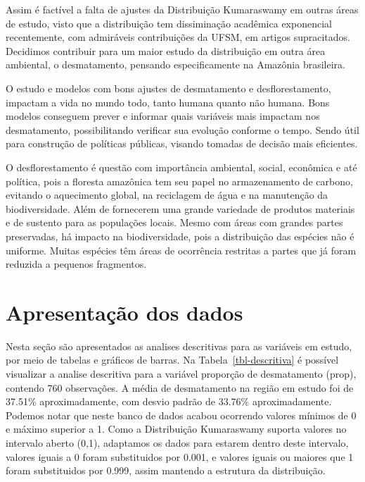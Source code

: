 \documentclass[
]{article}
\begin{document}
Assim é factível a falta de ajustes da Distribuição Kumaraswamy em
outras áreas de estudo, visto que a distribuição tem dissiminação
acadêmica exponencial recentemente, com admiráveis contribuições da
UFSM, em artigos supracitados. Decidimos contribuir para um maior estudo
da distribuição em outra área ambiental, o desmatamento, pensando
especificamente na Amazônia brasileira.

O estudo e modelos com bons ajustes de desmatamento e desflorestamento,
impactam a vida no mundo todo, tanto humana quanto não humana. Bons
modelos conseguem prever e informar quais variáveis mais impactam nos
desmatamento, possibilitando verificar sua evolução conforme o tempo.
Sendo útil para construção de políticas públicas, visando tomadas de
decisão mais eficientes.

O desflorestamento é questão com importância ambiental, social,
econômica e até política, pois a floresta amazônica tem seu papel no
armazenamento de carbono, evitando o aquecimento global, na reciclagem
de água e na manutenção da biodiversidade. Além de fornecerem uma grande
variedade de produtos materiais e de sustento para as populações locais.
Mesmo com áreas com grandes partes preservadas, há impacto na
biodiversidade, pois a distribuição das espécies não é uniforme. Muitas
espécies têm áreas de ocorrência restritas a partes que já foram
reduzida a pequenos fragmentos.

\section{\centering Apresentação dos dados}

Nesta seção são apresentados as analises descritivas para as variáveis
em estudo, por meio de tabelas e gráficos de barras. Na
Tabela~\ref{tbl-descritiva} é possível visualizar a analise descritiva
para a variável proporção de desmatamento (prop), contendo 760
observações. A média de desmatamento na região em estudo foi de 37.51\%
aproximadamente, com desvio padrão de 33.76\% aproximadamente. Podemos
notar que neste banco de dados acabou ocorrendo valores mínimos de 0 e
máximo superior a 1. Como a Distribuição Kumaraswamy suporta valores no
intervalo aberto (0,1), adaptamos os dados para estarem dentro deste
intervalo, valores iguais a 0 foram substituidos por 0.001, e valores
iguais ou maiores que 1 foram substituidos por 0.999, assim mantendo a
estrutura da distribuição.
\end{document}
